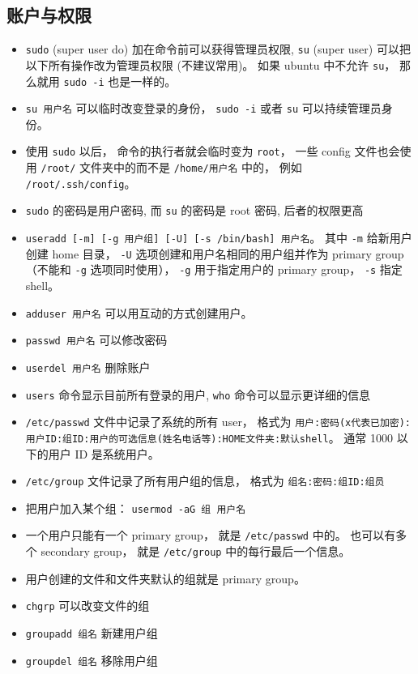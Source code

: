 \subsection{账户与权限}
\begin{itemize}
\item \verb`sudo` (super user do) 加在命令前可以获得管理员权限, \verb`su` (super user) 可以把以下所有操作改为管理员权限 (不建议常用)。 如果 ubuntu 中不允许 \verb|su|， 那么就用 \verb|sudo -i| 也是一样的。
\item \verb`su 用户名` 可以临时改变登录的身份， \verb|sudo -i| 或者 \verb|su| 可以持续管理员身份。
\item 使用 \verb|sudo| 以后， 命令的执行者就会临时变为 \verb|root|， 一些 config 文件也会使用 \verb|/root/| 文件夹中的而不是 \verb|/home/用户名| 中的， 例如 \verb|/root/.ssh/config|。
\item \verb`sudo` 的密码是用户密码, 而 \verb`su` 的密码是 root 密码, 后者的权限更高
\item \verb`useradd [-m] [-g 用户组] [-U] [-s /bin/bash] 用户名`。 其中 \verb|-m| 给新用户创建 home 目录， \verb|-U| 选项创建和用户名相同的用户组并作为 primary group （不能和 \verb|-g| 选项同时使用）， \verb|-g| 用于指定用户的 primary group， \verb|-s| 指定 shell。
\item \verb|adduser 用户名| 可以用互动的方式创建用户。
\item \verb`passwd 用户名` 可以修改密码
\item \verb`userdel 用户名` 删除账户
\item \verb`users` 命令显示目前所有登录的用户, \verb`who` 命令可以显示更详细的信息
\item \verb`/etc/passwd` 文件中记录了系统的所有 user， 格式为 \verb|用户:密码(x代表已加密):用户ID:组ID:用户的可选信息(姓名电话等):HOME文件夹:默认shell|。 通常 1000 以下的用户 ID 是系统用户。
\item \verb|/etc/group| 文件记录了所有用户组的信息， 格式为 \verb|组名:密码:组ID:组员|
\item 把用户加入某个组： \verb|usermod -aG 组 用户名|
\item 一个用户只能有一个 primary group， 就是 \verb|/etc/passwd| 中的。 也可以有多个 secondary group， 就是 \verb|/etc/group| 中的每行最后一个信息。
\item 用户创建的文件和文件夹默认的组就是 primary group。
\item \verb|chgrp| 可以改变文件的组
\item \verb|groupadd 组名| 新建用户组
\item \verb`groupdel 组名` 移除用户组

\end{itemize}
